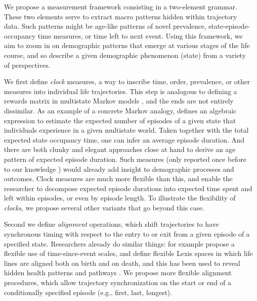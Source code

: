 \documentclass{article}
\begin{document}
% 
% 
% 
% 
We propose a measurement framework consisting in a two-element grammar. These two elements serve to extract macro patterns hidden within trajectory data. Such patterns might be age-like patterns of novel prevalence, state-episode-occupancy time measures, or time left to next event. Using this framework, we aim to zoom in on demographic patterns that emerge at various stages of the life course, and so describe a given demographic phenomenon (state) from a variety of perspectives. 

We first define \emph{clock} measures, a way to inscribe time, order, prevalence, or other measures into individual life trajectories. This step is analogous to defining a rewards matrix in multistate Markov models \citep[see e.g.][]{caswell2018matrix}, and the ends are not entirely dissimilar. As an example of a concrete Markov analogy, \citet{dudel2017b} defines an algebraic expression to estimate the expected number of episodes of a given state that individuals experience in a given multistate world. Taken together with the total expected state occupancy time, one can infer an average episode duration. And there are both clunky and elegant approaches close at hand to derive an age pattern of expected episode duration. Such measures (only reported once before to our knowledge \citep{laditka1998new}) would already add insight to demographic processes and outcomes. Clock measures are much more flexible than this, and enable the researcher to decompose expected episode durations into expected time spent and left within episodes, or even by episode length. To illustrate the flexibility of \emph{clocks}, we propose several other variants that go beyond this case.

Second we define \emph{alignment} operations, which shift trajectories to have synchronous timing with respect to the entry to or exit from a given episode of a specified state. Researchers already do similar things: for example \citet{iacobelli2013multiple} propose a flexible use of time-since-event scales, and \citet{riffe2017unified} define flexible Lexis spaces in which life lines are aligned both on birth and on death, and this has been used to reveal hidden health patterns \citep{riffe2016time} and pathways \citep{potente2018disability, raab2018pathways}. We propose more flexible alignment procedures, which allow trajectory synchronization on the start or end of a conditionally specified episode (e.g., first, last, longest).
\end{document}
